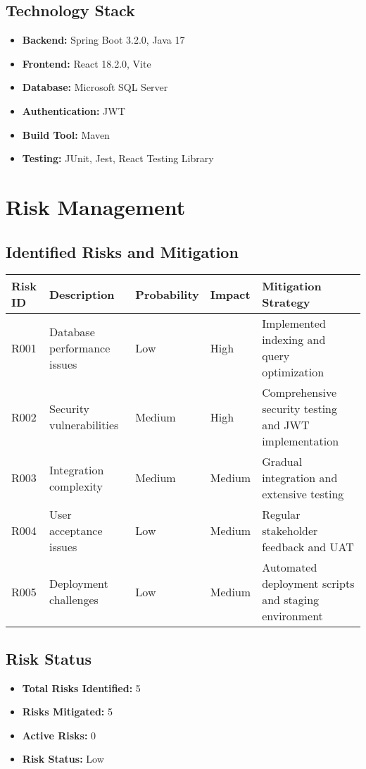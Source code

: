 \documentclass[12pt,a4paper]{article}
\begin{document}
\subsection{Technology Stack}
\begin{itemize}
    \item \textbf{Backend:} Spring Boot 3.2.0, Java 17
    \item \textbf{Frontend:} React 18.2.0, Vite
    \item \textbf{Database:} Microsoft SQL Server
    \item \textbf{Authentication:} JWT
    \item \textbf{Build Tool:} Maven
    \item \textbf{Testing:} JUnit, Jest, React Testing Library
\end{itemize}

\section{Risk Management}

\subsection{Identified Risks and Mitigation}
\begin{longtable}{|p{2cm}|p{3cm}|p{2cm}|p{3cm}|p{3cm}|}
\hline
\rowcolor{lightgray}
\textbf{Risk ID} & \textbf{Description} & \textbf{Probability} & \textbf{Impact} & \textbf{Mitigation Strategy} \\
\hline
R001 & Database performance issues & Low & High & Implemented indexing and query optimization \\
\hline
R002 & Security vulnerabilities & Medium & High & Comprehensive security testing and JWT implementation \\
\hline
R003 & Integration complexity & Medium & Medium & Gradual integration and extensive testing \\
\hline
R004 & User acceptance issues & Low & Medium & Regular stakeholder feedback and UAT \\
\hline
R005 & Deployment challenges & Low & Medium & Automated deployment scripts and staging environment \\
\hline
\end{longtable}

\subsection{Risk Status}
\begin{itemize}
    \item \textbf{Total Risks Identified:} 5
    \item \textbf{Risks Mitigated:} 5
    \item \textbf{Active Risks:} 0
    \item \textbf{Risk Status:} Low
\end{itemize}
\end{document}
